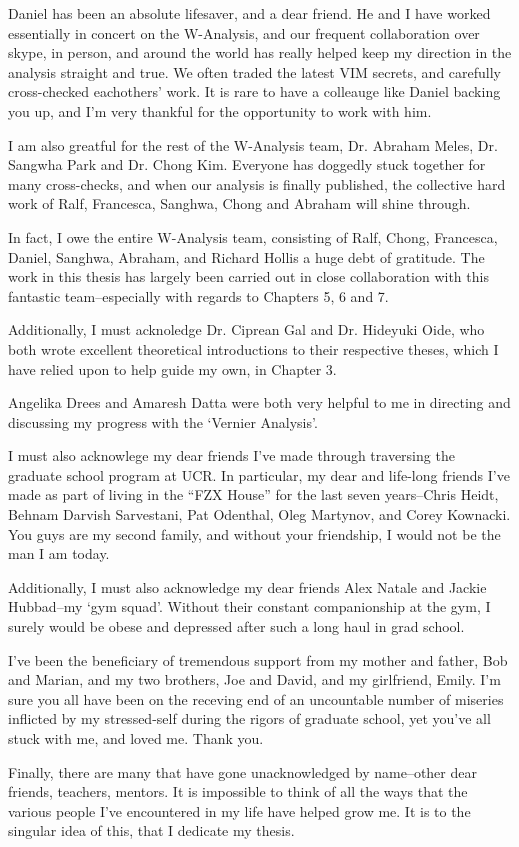 Daniel has been an absolute lifesaver, and a dear friend. He and I have worked
essentially in concert on the W-Analysis, and our frequent collaboration over
skype, in person, and around the world has really helped keep my direction in
the analysis straight and true.  We often traded the latest VIM secrets, and
carefully cross-checked eachothers' work. It is rare to have a colleauge like
Daniel backing you up, and I'm very thankful for the opportunity to work with
him.

I am also greatful for the rest of the W-Analysis team, Dr. Abraham Meles, Dr.
Sangwha Park and Dr. Chong Kim. Everyone has doggedly stuck together for many
cross-checks, and when our analysis is finally published, the collective hard
work of Ralf, Francesca, Sanghwa, Chong and Abraham will shine through.

In fact, I owe the entire W-Analysis team, consisting of Ralf, Chong,
Francesca, Daniel, Sanghwa, Abraham, and Richard Hollis a huge debt of
gratitude. The work in this thesis has largely been carried out in close
collaboration with this fantastic team--especially with regards to Chapters 5,
6 and 7.

Additionally, I must acknoledge Dr. Ciprean Gal and Dr. Hideyuki Oide, who both
wrote excellent theoretical introductions to their respective theses, which I
have relied upon to help guide my own, in Chapter 3.

Angelika Drees and Amaresh Datta were both very helpful to me in directing and
discussing my progress with the `Vernier Analysis'.

I must also acknowlege my dear friends I've made through traversing the graduate
school program at UCR. In particular, my dear and life-long friends I've made as
part of living in the ``FZX House'' for the last seven years--Chris Heidt, Behnam
Darvish Sarvestani, Pat Odenthal, Oleg Martynov, and Corey Kownacki. You guys
are my second family, and without your friendship, I would not be the man I am
today.

Additionally, I must also acknowledge my dear friends Alex Natale and Jackie
Hubbad--my `gym squad'. Without their constant companionship at the gym, I
surely would be obese and depressed after such a long haul in grad school.

I've been the beneficiary of tremendous support from my mother and father, Bob
and Marian, and my two brothers, Joe and David, and my girlfriend, Emily.
I'm sure you all have been on the receving end of an uncountable number of
miseries inflicted by my stressed-self during the rigors of graduate school, yet
you've all stuck with me, and loved me.  Thank you.

Finally, there are many that have gone unacknowledged by name--other dear
friends, teachers, mentors. It is impossible to think of all the ways that the
various people I've encountered in my life have helped grow me. It is to the
singular idea of this, that I dedicate my thesis.
